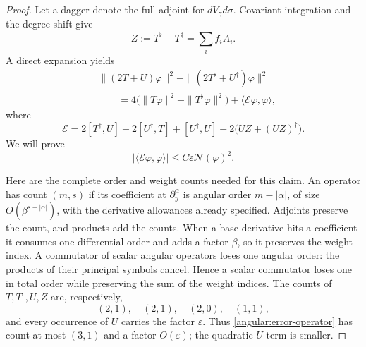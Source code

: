 \documentclass[11pt,a4paper]{article}
\newcommand{\eps}{\varepsilon}
\numberwithin{equation}{section}
\begin{document}
\begin{proof}
Let a dagger denote the full adjoint for $dV_\gamma d\sigma$.
Covariant integration and the degree shift give
\begin{equation}\label{angular:Z-definition}
 Z:=T^\flat-T^\dagger=\sum_i f_iA_i.
\end{equation}
A direct expansion yields
\begin{equation}\label{angular:norm-comparison}
 \begin{split}
 &\|(2T+U)\varphi\|^2-
                \|(2T^\flat+U^\dagger)\varphi\|^2\\
 &\qquad=4\bigl(\|T\varphi\|^2-\|T^\flat\varphi\|^2\bigr)
                       +\langle\mathcal E\varphi,\varphi\rangle,
 \end{split}
\end{equation}
where
\begin{equation}\label{angular:error-operator}
 \mathcal E=2[T^\dagger,U]+2[U^\dagger,T]+[U^\dagger,U]
                       -2\bigl(UZ+(UZ)^\dagger\bigr).
\end{equation}
We will prove
\begin{equation}\label{angular:error-form-bound}
 |\langle\mathcal E\varphi,\varphi\rangle|
                         \le C\eps\mathcal N(\varphi)^2.
\end{equation}

Here are the complete order and weight counts needed for this claim.
An operator has count $(m,s)$ if its coefficient at $\partial_y^\alpha$
is angular order $m-|\alpha|$, of size $O(\beta^{s-|\alpha|})$,
with the derivative allowances already specified.
Adjoints preserve the count, and products add the counts.  When a base
derivative hits a coefficient it consumes one differential order and
adds a factor $\beta$, so it preserves the weight index.  A commutator
of scalar angular operators loses one angular order: the products of
their principal symbols cancel.  Hence a scalar commutator loses one in
total order while preserving the sum of the weight indices.
The counts of $T,T^\dagger,U,Z$ are, respectively,
\[
 (2,1),\quad(2,1),\quad(2,0),\quad(1,1),
\]
and every occurrence of $U$ carries the factor $\eps$.  Thus
\eqref{angular:error-operator} has count at most $(3,1)$ and a factor
$O(\eps)$; the quadratic $U$ term is smaller.


\end{proof}
\end{document}
